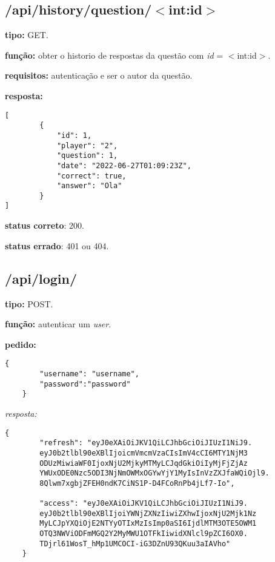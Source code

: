 \documentclass[11pt,a4paper]{report}
\begin{document}
\newpage

\subsection{/api/history/question/$<$int:id$>$}

\textbf{tipo:} GET.

\textbf{função:} obter o historio de respostas da questão com \emph{id} = $<$int:id$>$.

\textbf{requisitos:} autenticação e ser o autor da questão.

\textbf{resposta:}

\begin{lstlisting}[style = code]
    [
        {
            "id": 1,
            "player": "2",
            "question": 1,
            "date": "2022-06-27T01:09:23Z",
            "correct": true,
            "answer": "Ola"
        }
]
\end{lstlisting}

\textbf{status correto}: 200.

\textbf{status errado}: 401 ou 404.

\subsection{/api/login/}

\textbf{tipo:} POST.

\textbf{função:} autenticar um \emph{user}.


\textbf{pedido:}

\begin{lstlisting}[style = code]
    {
        "username": "username",
        "password":"password"
    }
\end{lstlisting}

\emph{resposta:}

\begin{lstlisting}[style = code]
    {
        "refresh": "eyJ0eXAiOiJKV1QiLCJhbGciOiJIUzI1NiJ9.
        eyJ0b2tlbl90eXBlIjoicmVmcmVzaCIsImV4cCI6MTY1NjM3
        ODUzMiwiaWF0IjoxNjU2MjkyMTMyLCJqdGkiOiIyMjFjZjAz
        YWUxODE0Nzc5ODI3NjNmOWMxOGYwYjY1MyIsInVzZXJfaWQiOjl9.
        8Qlwm7xgbjZFEH0ndK7CiNS1P-D4FCoRnPb4jLf7-Io",
    
        "access": "eyJ0eXAiOiJKV1QiLCJhbGciOiJIUzI1NiJ9.
        eyJ0b2tlbl90eXBlIjoiYWNjZXNzIiwiZXhwIjoxNjU2Mjk1Nz
        MyLCJpYXQiOjE2NTYyOTIxMzIsImp0aSI6IjdlMTM3OTE5OWM1
        OTQ3NWViODFmMGQ2Y2MyMWU1OTFkIiwidXNlcl9pZCI6OX0.
        TDjrl61WosT_hMp1UMCOCI-iG3DZnU93QKuu3aIAVho"
    }

\end{lstlisting}
\end{document}

